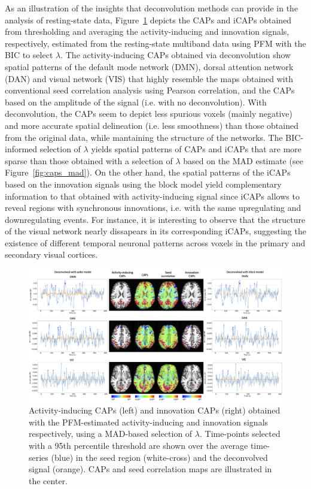 As an illustration of the insights that deconvolution methods can provide in the analysis of resting-state data, Figure~\ref{fig:caps} depicts the CAPs and iCAPs obtained from thresholding and averaging the activity-inducing and innovation signals, respectively, estimated from the resting-state multiband data using PFM with the BIC to select $\lambda$. The activity-inducing CAPs obtained via deconvolution show spatial patterns of the default mode network (DMN), dorsal attention network (DAN) and visual network (VIS) that highly resemble the maps obtained with conventional seed correlation analysis using Pearson correlation, and the CAPs based on the amplitude of the signal (i.e. with no deconvolution). With deconvolution, the CAPs seem to depict less spurious voxels (mainly negative) and more accurate spatial delineation (i.e. less smoothness) than those obtained from the original data, while mantaining the structure of the networks. The BIC-informed selection of $\lambda$ yields spatial patterns of CAPs and iCAPs that are more sparse than those obtained with a selection of $\lambda$ based on the MAD estimate (see Figure~\ref{fig:caps_mad}). On the other hand, the spatial patterns of the iCAPs based on the innovation signals using the block model yield complementary information to that obtained with activity-inducing signal since iCAPs allows to reveal regions with synchronous innovations, i.e. with the same upregulating and downregulating events. For instance, it is interesting to observe that the structure of the visual network nearly dissapears in its corresponding iCAPs, suggesting the existence of different temporal neuronal patterns across voxels in the primary and secondary visual cortices. 

\begin{figure}[t!]
    \begin{center}
        \includegraphics[width=\textwidth]{figures/caps.png}
    \end{center}
    \caption{Activity-inducing CAPs (left) and innovation CAPs (right) obtained with the PFM-estimated activity-inducing and innovation signals respectively, using a MAD-based selection of $\lambda$. Time-points selected with a 95th percentile threshold are shown over the average time-series (blue) in the seed region (white-cross) and the deconvolved signal (orange). CAPs and seed correlation maps are illustrated in the center.}
\label{fig:caps}
\end{figure}

